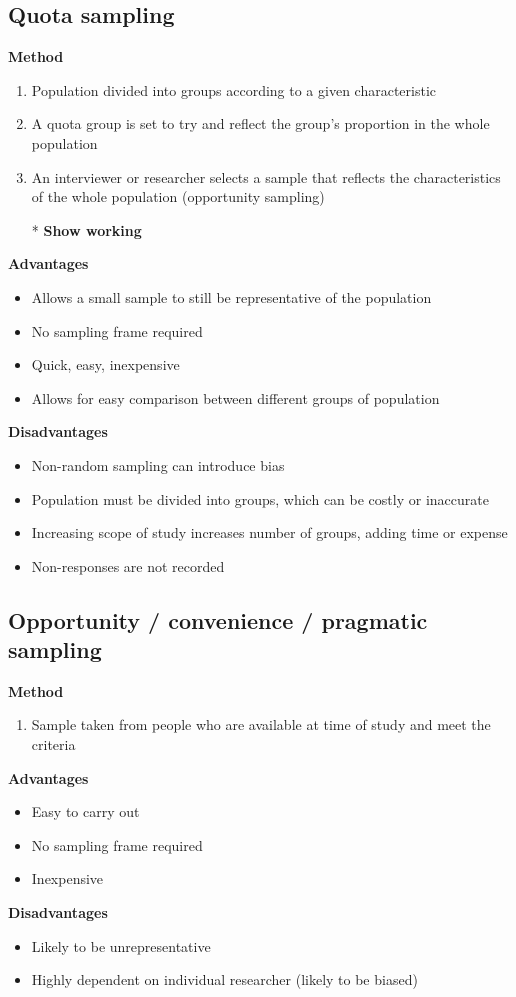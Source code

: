 \subsection{Quota sampling}
\textbf{Method}
\begin{enumerate}
	\item Population divided into groups according to a given characteristic
	\item A quota group is set to try and reflect the group's proportion in the whole population
	\item An interviewer or researcher selects a sample that reflects the characteristics of the whole population (opportunity sampling)
	\item[*] \textbf{Show working}
\end{enumerate}
\textbf{Advantages}
\begin{itemize}
	\item Allows a small sample to still be representative of the population
	\item No sampling frame required
	\item Quick, easy, inexpensive
	\item Allows for easy comparison between different groups of population
\end{itemize}
\textbf{Disadvantages}
\begin{itemize}
	\item Non-random sampling can introduce bias
	\item Population must be divided into groups, which can be costly or inaccurate
	\item Increasing scope of study increases number of groups, adding time or expense
	\item Non-responses are not recorded
\end{itemize}

\subsection{Opportunity / convenience / pragmatic sampling}
\textbf{Method}
\begin{enumerate}
	\item Sample taken from people who are available at time of study and meet the criteria
\end{enumerate}
\textbf{Advantages}
\begin{itemize}
	\item Easy to carry out
	\item No sampling frame required
	\item Inexpensive
\end{itemize}
\textbf{Disadvantages}
\begin{itemize}
	\item Likely to be unrepresentative
	\item Highly dependent on individual researcher (likely to be biased)
\end{itemize}

